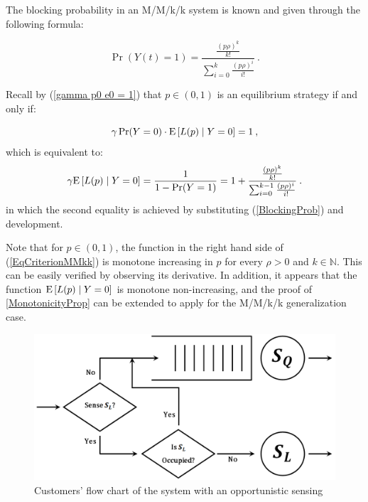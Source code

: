 \documentclass[11pt]{article}
\numberwithin{equation}{section}
\newcommand{\e}{{\rm E}}
\begin{document}
The blocking probability in an M/M/k/k system is known and given through the following formula:

\begin{equation}
\Pr(Y(t)=1) = \frac{\frac{(p\rho)^k}{k!}}{\sum_{i=0}^k \frac{(p\rho)^i}{i!}} \:. \label{BlockingProb}
\end{equation}

Recall by (\ref{gamma p0 e0 = 1}) that $p \in (0,1)$ is an equilibrium strategy if and only if:

\begin{equation}
\gamma \Pr(Y=0) \cdot \e\left[L(p)\mid Y=0\right] = 1\:,
\end{equation}
which is equivalent to:
\begin{equation}
\gamma \e\left[L(p)\mid Y=0\right] = \frac{1}{1-\Pr(Y=1)} = 1 + \frac{\frac{(p\rho)^k}{k!}}{\sum_{i=0}^{k-1} \frac{(p\rho)^i}{i!}} \:. \label{EqCriterionMMkk}
\end{equation}
in which the second equality is achieved by substituting (\ref{BlockingProb}) and development.

Note that for $p \in (0,1)$, the function in the right hand side of (\ref{EqCriterionMMkk}) is monotone increasing in $p$ for every $\rho>0$ and $k \in \mathbb{N}$. This can be easily verified by observing its derivative. In addition, it appears that the function $\e\left[L(p)\mid Y=0\right]$ is monotone non-increasing, and the proof of \ref{MonotonicityProp} can be extended to apply for the M/M/k/k generalization case.

%
%

\newpage
\begin{figure}[h!]
    \centering
    \includegraphics[width=1\textwidth]{plots/Model.png}
    \caption{Customers' flow chart of the system with an opportunistic sensing}
    \label{CustomersFlow}
\end{figure}
\end{document}
